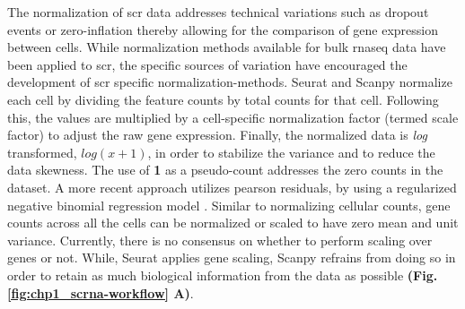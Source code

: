
The normalization of \gls{scr} data addresses technical variations such as dropout events or zero-inflation thereby allowing for the comparison of gene expression between cells. While normalization methods available for bulk \gls{rnaseq} data have been applied to \gls{scr}, the specific sources of variation have encouraged the development of \gls{scr} specific normalization-methods. Seurat \textbf{\cite{butler_integrating_2018,stuart_comprehensive_2019,hao_integrated_2021}} and Scanpy \textbf{\cite{wolf_scanpy_2018}} normalize each cell by dividing the feature counts by total counts for that cell. Following this, the values are multiplied by a cell-specific normalization factor (termed scale factor) to adjust the raw gene expression. Finally, the normalized data is \textit{log} transformed, \begin{math}log(x+1)\end{math}, in order to stabilize the variance and to reduce the data skewness. The use of \textbf{1} as a pseudo-count addresses the zero counts in the dataset. A more recent approach utilizes pearson residuals, by using a regularized negative binomial regression model \textbf{\cite{hafemeister_normalization_2019}}. Similar to normalizing cellular counts, gene counts across all the cells can be normalized or scaled to have zero mean and unit variance. Currently, there is no consensus on whether to perform scaling over genes or not. While, Seurat \textbf{\cite{stuart_comprehensive_2019,hao_integrated_2021}} applies gene scaling, Scanpy \textbf{\cite{wolf_scanpy_2018}} refrains from doing so in order to retain as much biological information from the data as possible \textbf{(Fig. \ref{fig:chp1_scrna-workflow} A)}.

